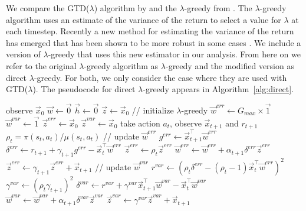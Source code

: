 \documentclass[../main.tex]{subfiles}
\begin{document}
We compare the GTD($\lambda$) algorithm by \citep{sutton2009fast} and the {$\lambda$}-greedy from \citep{white2016greedy}. The {$\lambda$}-greedy algorithm uses an estimate of the variance of the return to select a value for $\lambda$ at each timestep. Recently a new method for estimating the variance of the return has emerged that has been shown to be more robust in some cases \cite{sherstan2018directly}. We include a version of {$\lambda$}-greedy that uses this new estimator in our analysis. From here on we refer to the original {$\lambda$}-greedy algorithm as {$\lambda$}-greedy and the modified version as direct {$\lambda$}-greedy. For both, we only consider the case where they are used with GTD($\lambda$). The pseudocode for direct {$\lambda$}-greedy appears in Algorithm~\ref{alg:direct}.

\begin{algorithm}[tb]
    \begin{algorithmic}
        \STATE observe $\vec{x}_0$
        \STATE $\vec{w} \leftarrow \vec{0}$
        \STATE $\vec{h} \leftarrow \vec{0}$
        \STATE $\vec{z} \leftarrow \vec{x}_0$
        \STATE // initialize $\lambda$-greedy
        \STATE $\vec{w}^{err} \leftarrow G_{max} \times \vec{1}$
        \STATE $\vec{w}^{var} \leftarrow \vec{1}$
        \STATE $\vec{z}^{err} \leftarrow \vec{x}_0$
        \STATE $\vec{z}^{var} \leftarrow \vec{x}_0$
        \REPEAT
            \STATE take action $a_t$, observe $\vec{x}_{t + 1}$ and $r_{t + 1}$
            \STATE $\rho_t = \pi(s_t, a_t) / \mu(s_t, a_t)$
            \STATE // update $\vec{w}^{err}$
            \STATE $g^{err} \leftarrow \vec{x}_{t + 1}^{\top} \vec{w}^{err}$
            \STATE $\delta^{err} \leftarrow r_{t + 1} + \gamma_{t + 1} g^{err} - \vec{x}_t^{\top} \vec{w}^{err}$
            \STATE $\vec{z}^{err} \leftarrow \rho_t \vec{z}^{err}$
            \STATE $\vec{w}^{err} \leftarrow \vec{w}^{err} + \alpha_{t + 1} \delta^{err} \vec{z}^{err}$
            \STATE $\vec{z}^{err} \leftarrow \gamma_{t + 1} \vec{z}^{err} + \vec{x}_{t + 1}$
            \STATE // update $\vec{w}^{var}$
            \STATE $r^{var} \leftarrow (\rho_t \delta^{err} - (\rho_t - 1) \vec{x}_t^{\top} \vec{w}^{err})^2$
            \STATE $\gamma^{var} \leftarrow (\rho_t \gamma_{t + 1})^2$
            \STATE $\delta^{var} \leftarrow r^{var} + \gamma^{var} \vec{x}_{t + 1}^{\top} \vec{w}^{var} - \vec{x}_t^{\top} \vec{w}^{var}$
            \STATE $\vec{w}^{var} \leftarrow \vec{w}^{var} + \alpha_{t + 1} \delta^{var} \vec{z}^{var}$
            \STATE $\vec{z}^{var} \leftarrow \gamma^{var} \vec{z}^{var} + \vec{x}_{t + 1}$

\end{algorithmic}
\end{algorithm}
\end{document}
